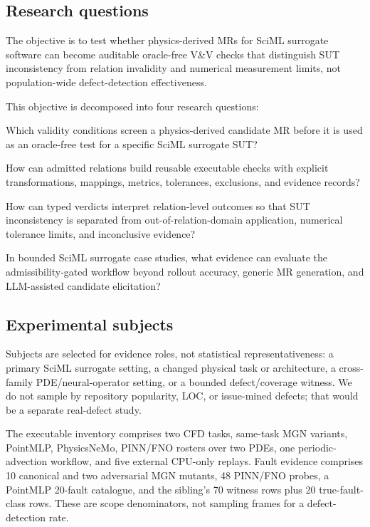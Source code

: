 \documentclass[preprint,12pt,authoryear]{elsarticle}
\begin{document}
\subsection{Research questions}
\label{subsec:rqs}
\label{subsec:evaluation-logic}

The objective is to test whether physics-derived MRs for SciML surrogate software can become auditable oracle-free V\&V checks that distinguish SUT inconsistency from relation invalidity and numerical measurement limits, not population-wide defect-detection effectiveness.

This objective is decomposed into four research questions:
\begin{description}[leftmargin=!,labelwidth=2.4cm]
\item[RQ1 -- Screen.] Which validity conditions screen a physics-derived candidate MR before it is used as an oracle-free test for a specific SciML surrogate SUT?
\item[RQ2 -- Build.] How can admitted relations build reusable executable checks with explicit transformations, mappings, metrics, tolerances, exclusions, and evidence records?
\item[RQ3 -- Interpret.] How can typed verdicts interpret relation-level outcomes so that SUT inconsistency is separated from out-of-relation-domain application, numerical tolerance limits, and inconclusive evidence?
\item[RQ4 -- Evaluate.] In bounded SciML surrogate case studies, what evidence can evaluate the admissibility-gated workflow beyond rollout accuracy, generic MR generation, and LLM-assisted candidate elicitation?
\end{description}

\subsection{Experimental subjects}
\label{subsec:suts}

Subjects are selected for evidence roles, not statistical representativeness: a primary SciML surrogate setting, a changed physical task or architecture, a cross-family PDE/neural-operator setting, or a bounded defect/coverage witness. We do not sample by repository popularity, LOC, or issue-mined defects; that would be a separate real-defect study.

The executable inventory comprises two CFD tasks, same-task MGN variants, PointMLP, PhysicsNeMo, PINN/FNO rosters over two PDEs, one periodic-advection workflow, and five external CPU-only replays. Fault evidence comprises 10 canonical and two adversarial MGN mutants, 48 PINN/FNO probes, a PointMLP 20-fault catalogue, and the sibling's 70 witness rows plus 20 true-fault-class rows. These are scope denominators, not sampling frames for a defect-detection rate.
\end{document}

